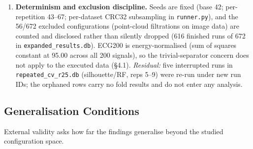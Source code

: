 \documentclass[12pt, a4paper]{report}
\theoremstyle{definition}
\theoremstyle{plain}
\theoremstyle{remark}
\begin{document}
\begin{enumerate}
    scale as well as topology. \emph{Severity: moderate.} \emph{Boundary:} the matched genus-1/genus-2 control (identical norm
    distributions) shows TDA retains 95.83\% where norm features collapse
    to 48--58\% at $\sigma{=}0.30$ (\texttt{baseline\_experiments.db},
    60 fold accuracies). \emph{Residual caveat:} the matched pair is still
    linearly separable in raw coordinates (logistic 100\% at both noise
    levels, \texttt{baseline\_experiments.db}) --- the control isolates
    the norm/scale confound, not linear separability in general.
  \item \textbf{Determinism and exclusion discipline.} Seeds are fixed
    (base 42; per-repetition 43--67; per-dataset CRC32 subsampling in
    \texttt{runner.py}), and the 56/672 excluded configurations
    (point-cloud filtrations on image data) are counted and disclosed
    rather than silently dropped (616 finished runs of 672 in
    \texttt{expanded\_results.db}). ECG200 is energy-normalised (sum of
    squares constant at 95.00 across all 200 signals), so the
    trivial-separator concern does not apply to the executed data
    (\S4.1). \emph{Residual:} five interrupted runs in
    \texttt{repeated\_cv\_r25.db} (silhouette/RF, reps 5--9) were re-run
    under new run IDs; the orphaned rows carry no fold results and do not
    enter any analysis.
\end{enumerate}

\subsection{Generalisation Conditions}
\label{sec:threats_external}

External validity asks how far the findings generalise beyond the studied
configuration space.
\end{document}

